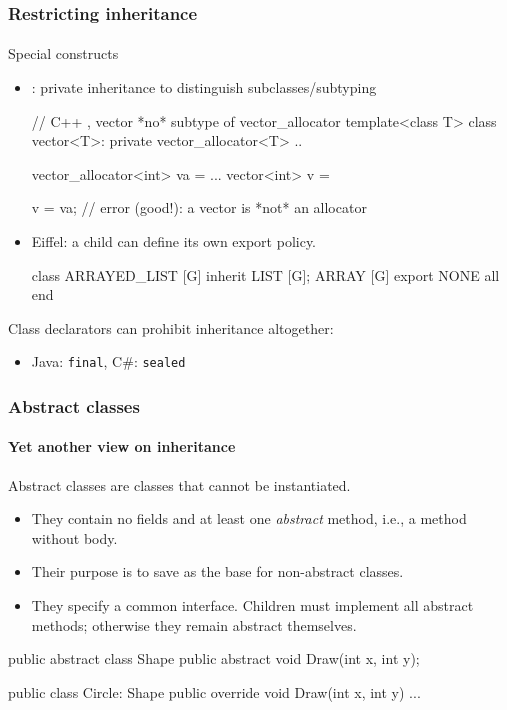 \documentclass{beamer}
\begin{document}
\begin{frame}[fragile]
\frametitle{Restricting inheritance}
\framesubtitle{}
Special constructs 
\begin{itemize}
\item \Cpp: private inheritance to distinguish subclasses/subtyping
\begin{cplus3}
// C++ , vector *no* subtype of vector_allocator
template<class T>
class vector<T>: private vector_allocator<T>  {..}

vector_allocator<int> va = ...
vector<int> v = 

v = va;  // error (good!): a vector is *not* an allocator
\end{cplus3}
\item Eiffel: a child can define its own export policy.
\begin{eiffel}
class ARRAYED_LIST [G] inherit 
    LIST [G]; 
    ARRAY [G]
    export {NONE} all end

\end{eiffel}
\end{itemize}

Class declarators
can prohibit inheritance altogether:
\begin{itemize}
\item Java: \texttt{final}, C\#: \texttt{sealed}
\end{itemize} 
\end{frame}

\begin{frame}[fragile]

\frametitle{Abstract classes}
\framesubtitle{Yet another view on inheritance}
Abstract classes are classes that cannot be instantiated. 

\begin{itemize}
\item They contain no fields and at least one \textit{abstract} method, i.e., 
a method without body. 
\item Their purpose is to save as the base for non-abstract classes.
\item They specify a common interface. Children must
implement all abstract methods; otherwise they remain abstract
themselves.

\end{itemize}

\begin{cplus3}
public abstract class Shape {
    public abstract void Draw(int x, int y);
}

public class Circle: Shape {
    public override void Draw(int x, int y) { ... }
}
\end{cplus3}
\end{frame}
\end{document}
